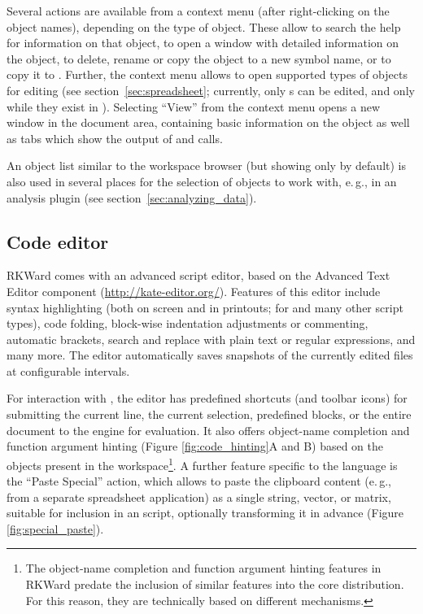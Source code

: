 Several actions are available from a context menu (after right-clicking
on the object names), depending on the type of object. These allow to search the
 help for information on that object, to
open a window with detailed information on the object, to delete, rename or copy the object to a new symbol name, or to
copy it to . Further, the context menu allows to open
supported types of objects for editing (see section~\ref{sec:spreadsheet}; currently, only
s can be edited, and only while they exist in ). 
Selecting ``View'' from the 
context menu opens a new window in the
document area, containing basic information on the object as well as 
tabs which show the output of
 and  calls.

An object list similar to the workspace browser (but showing only 
 by default) is also used in several places for the
selection of objects to work with, e.\,g., in an analysis plugin (see section~\ref{sec:analyzing_data}).


\subsection{Code editor}
\label{sec:code_editor}

RKWard comes with an advanced
 script editor, based on the
 Advanced Text Editor component
(\url{http://kate-editor.org/}). Features of this
editor include syntax highlighting (both on screen and in printouts; for
 and many other script types), code
folding, block-wise indentation adjustments or commenting, automatic
brackets, search and replace with plain text or regular expressions,
and many more. The editor automatically saves snapshots of the
currently edited files at configurable intervals.

For interaction with , the editor has
predefined shortcuts (and toolbar icons) for submitting the current line, the current 
selection, predefined blocks, or the entire document to the
 engine for evaluation. It also 
offers object-name completion and function argument hinting (Figure
\ref{fig:code_hinting}A and B) based on the objects present in
the  workspace\footnote{The object-name
completion and function argument hinting features in RKWard predate the
inclusion of similar features into the core
 distribution. For this reason, they are
technically based on different mechanisms.}. A further feature specific
to the  language is the
``Paste Special'' action, which allows to
paste the clipboard content (e.\,g., from a separate spreadsheet
application) as a single string, vector, or matrix, suitable
for inclusion in an  script, optionally
transforming it in advance (Figure \ref{fig:special_paste}).

